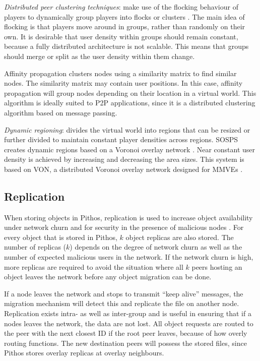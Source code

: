 \emph{Distributed peer clustering techniques}: make use of the flocking behaviour of players to dynamically group players into flocks or clusters
\cite{flocking}. The main idea of flocking is that players move around in groups, rather than randomly on their own. It is desirable that user
density within groups should remain constant, because a fully distributed architecture is not scalable. This means that groups should merge or split
as the user density within them change.

Affinity propagation clusters nodes using a similarity matrix to find similar nodes. The similarity matrix may contain user positions. In this case,
affinity propagation will group nodes depending on their location in a virtual world. This algorithm is ideally suited to P2P applications, since it
is a distributed clustering algorithm based on message passing.

\emph{Dynamic regioning}: divides the virtual world into regions that can be resized or further divided to maintain constant player densities across
regions. SOSPS creates dynamic regions based on a Voronoi overlay network \cite{voronoi_diagrams_survey}. Near constant user density is achieved by
increasing and decreasing the area sizes. This system is based on VON, a distributed Voronoi overlay network designed for MMVEs \cite{VON_VAST}.

\subsection{Replication}
\label{store_retrieve}

When storing objects in Pithos, replication is used to increase object availability under network churn and for security in the presence of malicious
nodes \cite{storage_and_chaching_PAST}. For every object that is stored in Pithos, $k$ object replicas are also stored. The number of replicas ($k$)
depends on the degree of network churn as well as the number of expected malicious users in the network. If the network churn is high, more replicas
are required to avoid the situation where all $k$ peers hosting an object leaves the network before any object migration can be done.

If a node leaves the network and stops to transmit ``keep alive'' messages, the migration mechanism will detect this and replicate the file on
another node. Replication exists intra- as well as inter-group and is useful in ensuring that if a nodes leaves the network, the data are not lost.
All object requests are routed to the peer with the next closest ID if the root peer leaves, because of how overly routing functions. The new
destination peers will possess the stored files, since Pithos stores overlay replicas at overlay neighbours.

